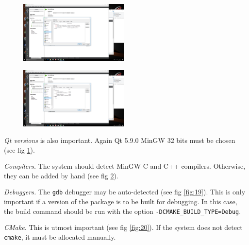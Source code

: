 \documentclass[a4paper,10pt]{article}
\begin{document}
\begin{minipage}{0.5\linewidth}
\begin{figure}[H]
\begin{center}
\includegraphics[width=5.5cm]{fig17.png}
\vspace*{-1mm}
\caption{\small  \label{fig:17}}
\end{center}
\end{figure}
\end{minipage}
\begin{minipage}{0.5\linewidth}
\begin{figure}[H]
\begin{center}
\includegraphics[width=5.5cm]{fig18.png}
\vspace*{-1mm}
\caption{\small  \label{fig:18}}
\end{center}
\end{figure}
\end{minipage}

{\it Qt versions} is also important. Again Qt 5.9.0 MinGW 32 bits must be chosen (see fig \ref{fig:17}).

{\it Compilers.} The system should detect MinGW C and C++ compilers. Otherwise, they can be added by hand
(see fig \ref{fig:18}).



{\it Debuggers.} The \texttt{gdb} debugger may be auto-detected (see fig \ref{fig:19}). This is only important if a
version of the package is to be built for debugging. In this case, the build command should be run with the option
\texttt{-DCMAKE\_BUILD\_TYPE=Debug}.

{\it CMake.} This is utmost important (see fig \ref{fig:20}). If the system does not detect \texttt{cmake}, 
it must be allocated manually.
\end{document}
